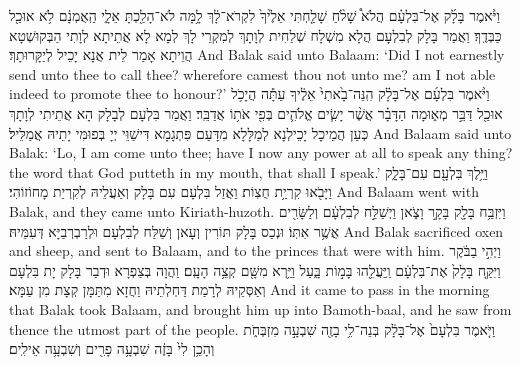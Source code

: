 {וַיֹּ֨אמֶר בָּלָ֜ק אֶל־בִּלְעָ֗ם הֲלֹא֩ שָׁלֹ֨חַ שָׁלַ֤חְתִּי אֵלֶ֙יךָ֙ לִקְרֹא־לָ֔ךְ לָ֥מָּה לֹא־הָלַ֖כְתָּ אֵלָ֑י הַֽאֻמְנָ֔ם לֹ֥א אוּכַ֖ל כַּבְּדֶֽךָ׃
}
{וַאֲמַר בָּלָק לְבִלְעָם הֲלָא מִשְׁלָח שְׁלַחִית לְוָתָךְ לְמִקְרֵי לָךְ לְמָא לָא אֲתֵיתָא לְוָתִי הַבְּקוּשְׁטָא הֲוֵיתָא אָמַר לֵית אֲנָא יָכֵיל לְיַקָּרוּתָךְ׃}
{And Balak said unto Balaam: ‘Did I not earnestly send unto thee to call thee? wherefore camest thou not unto me? am I not able indeed to promote thee to honour?’}{}
{וַיֹּ֨אמֶר בִּלְעָ֜ם אֶל־בָּלָ֗ק הִֽנֵּה־בָ֙אתִי֙ אֵלֶ֔יךָ עַתָּ֕ה הֲיָכֹ֥ל אוּכַ֖ל דַּבֵּ֣ר מְא֑וּמָה הַדָּבָ֗ר אֲשֶׁ֨ר יָשִׂ֧ים אֱלֹהִ֛ים בְּפִ֖י אֹת֥וֹ אֲדַבֵּֽר׃}
{וַאֲמַר בִּלְעָם לְבָלָק הָא אֲתֵיתִי לְוָתָךְ כְּעַן הֲמֵיכָל יָכֵילְנָא לְמַלָּלָא מִדָּעַם פִּתְגָמָא דִּישַׁוֵּי יְיָ בְּפוּמִּי יָתֵיהּ אֲמַלֵּיל׃}
{And Balaam said unto Balak: ‘Lo, I am come unto thee; have I now any power at all to speak any thing? the word that God putteth in my mouth, that shall I speak.’}{}
{וַיֵּ֥לֶךְ בִּלְעָ֖ם עִם־בָּלָ֑ק וַיָּבֹ֖אוּ קִרְיַ֥ת חֻצֽוֹת׃
}
{וַאֲזַל בִּלְעָם עִם בָּלָק וְאַעֲלֵיהּ לְקִרְיַת מָחוֹזוֹהִי׃}
{And Balaam went with Balak, and they came unto Kiriath-huzoth.}{}
{וַיִּזְבַּ֥ח בָּלָ֖ק בָּקָ֣ר וָצֹ֑אן וַיְשַׁלַּ֣ח לְבִלְעָ֔ם וְלַשָּׂרִ֖ים אֲשֶׁ֥ר אִתּֽוֹ׃
}
{וּנְכַס בָּלָק תּוֹרִין וְעָאן וְשַׁלַּח לְבִלְעָם וּלְרַבְרְבַיָּא דְּעִמֵּיהּ׃}
{And Balak sacrificed oxen and sheep, and sent to Balaam, and to the princes that were with him.}{}
{וַיְהִ֣י בַבֹּ֔קֶר וַיִּקַּ֤ח בָּלָק֙ אֶת־בִּלְעָ֔ם וַֽיַּעֲלֵ֖הוּ בָּמ֣וֹת בָּ֑עַל וַיַּ֥רְא מִשָּׁ֖ם קְצֵ֥ה הָעָֽם׃
}
{וַהֲוָה בְּצַפְרָא וּדְבַר בָּלָק יָת בִּלְעָם וְאַסְּקֵיהּ לְרָמַת דַּחְלְתֵיהּ וַחֲזָא מִתַּמָּן קְצָת מִן עַמָּא׃}
{And it came to pass in the morning that Balak took Balaam, and brought him up into Bamoth-baal, and he saw from thence the utmost part of the people.}{}
\newperek
{}%
{וַיֹּ֤אמֶר בִּלְעָם֙ אֶל־בָּלָ֔ק בְּנֵה־לִ֥י בָזֶ֖ה שִׁבְעָ֣ה מִזְבְּחֹ֑ת וְהָכֵ֥ן לִי֙ בָּזֶ֔ה שִׁבְעָ֥ה פָרִ֖ים וְשִׁבְעָ֥ה אֵילִֽים׃}
